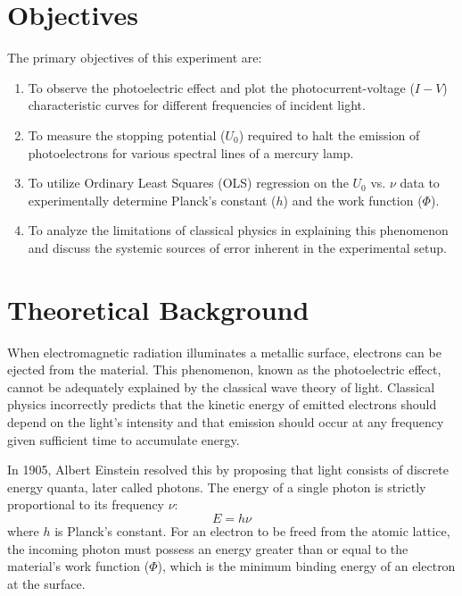 \documentclass[a4paper,11pt]{article}
\begin{document}
\section{Objectives}
The primary objectives of this experiment are:
\begin{enumerate}
    \item To observe the photoelectric effect and plot the photocurrent-voltage ($I-V$) characteristic curves for different frequencies of incident light.
    \item To measure the stopping potential ($U_0$) required to halt the emission of photoelectrons for various spectral lines of a mercury lamp.
    \item To utilize Ordinary Least Squares (OLS) regression on the $U_0$ vs. $\nu$ data to experimentally determine Planck's constant ($h$) and the work function ($\Phi$).
    \item To analyze the limitations of classical physics in explaining this phenomenon and discuss the systemic sources of error inherent in the experimental setup.
\end{enumerate}

\section{Theoretical Background}
When electromagnetic radiation illuminates a metallic surface, electrons can be ejected from the material. This phenomenon, known as the photoelectric effect, cannot be adequately explained by the classical wave theory of light. Classical physics incorrectly predicts that the kinetic energy of emitted electrons should depend on the light's intensity and that emission should occur at any frequency given sufficient time to accumulate energy.

In 1905, Albert Einstein resolved this by proposing that light consists of discrete energy quanta, later called photons. The energy of a single photon is strictly proportional to its frequency $\nu$:
\begin{equation}
    E = h \nu
\end{equation}
where $h$ is Planck's constant. For an electron to be freed from the atomic lattice, the incoming photon must possess an energy greater than or equal to the material's work function ($\Phi$), which is the minimum binding energy of an electron at the surface. 
\end{document}
